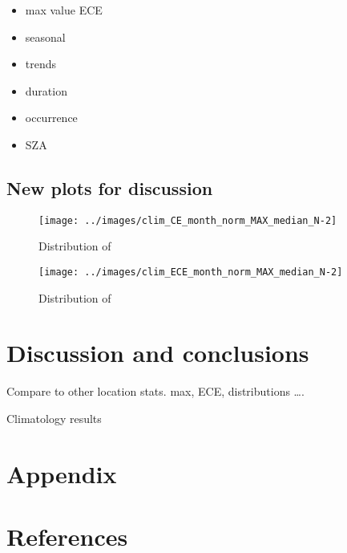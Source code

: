 \documentclass[
]{article}
\providecommand{\tightlist}{%
  \setlength{\itemsep}{0pt}\setlength{\parskip}{0pt}}
\begin{document}
\begin{itemize}
\tightlist
\item
  max value ECE
\item
  seasonal
\item
  trends
\item
  duration
\item
  occurrence
\item
  SZA
\end{itemize}

\FloatBarrier

\hypertarget{new-plots-for-discussion}{%
\subsection{New plots for discussion}\label{new-plots-for-discussion}}

\begin{figure}[h!]

{\centering \texttt{[image: ../images/clim\_CE\_month\_norm\_MAX\_median\_N-2]} 

}

\caption{Distribution of }\label{fig:unnamed-chunk-13}
\end{figure}

\begin{figure}[h!]

{\centering \texttt{[image: ../images/clim\_ECE\_month\_norm\_MAX\_median\_N-2]} 

}

\caption{Distribution of }\label{fig:unnamed-chunk-14}
\end{figure}

\FloatBarrier

\hypertarget{discussion-and-conclusions}{%
\section{Discussion and conclusions}\label{discussion-and-conclusions}}

Compare to other location stats.
max, ECE, distributions \ldots.

Climatology results

\hypertarget{appendix}{%
\section*{Appendix}\label{appendix}}

\hypertarget{references}{%
\section*{References}\label{references}}
\end{document}
